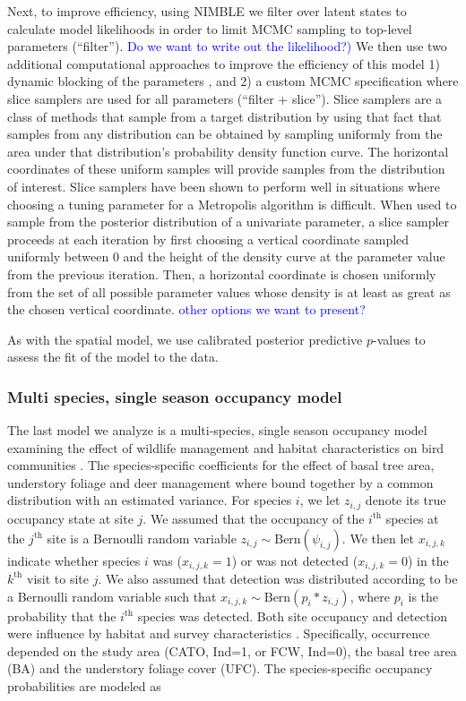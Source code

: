 \documentclass[12pt]{article}
\newcommand{\flagged}[1] {
  \textcolor{blue}{#1}
}
\begin{document}
Next, to improve efficiency, using NIMBLE we filter over latent states
to calculate model likelihoods in order to limit MCMC sampling to
top-level parameters (``filter''). \flagged{Do we want to write out
  the likelihood?)} We then use two additional computational
approaches to improve the efficiency of this model 1) dynamic blocking
of the parameters \citep[``filter + autoblocking'',
][]{turek2016efficient}, and 2) a custom MCMC specification where
slice samplers \citep{neal-03} are used for all parameters (``filter +
slice''). Slice samplers are a class of methods that sample from a
target distribution by using that fact that samples from any
distribution can be obtained by sampling uniformly from the area under
that distribution's probability density function curve.  The
horizontal coordinates of these uniform samples will provide samples
from the distribution of interest. Slice samplers have been shown to
perform well in situations where choosing a tuning parameter for a
Metropolis algorithm is difficult. When used to sample from the
posterior distribution of a univariate parameter, a slice sampler
proceeds at each iteration by first choosing a vertical coordinate
sampled uniformly between 0 and the height of the density curve at the
parameter value from the previous iteration.  Then, a horizontal
coordinate is chosen uniformly from the set of all possible parameter
values whose density is at least as great as the chosen vertical
coordinate.  \flagged{other options we want to present?}

As with the spatial model, we use calibrated posterior predictive
$p$-values \citep{hjort-etal-06} to assess the fit of the model to
the data.

\subsubsection*{Multi species, single season occupancy model}
\label{sec:msss}

The last model we analyze is a multi-species, single season occupancy
model examining the effect of wildlife management and habitat
characteristics on bird communities \citep{zipkin2010multi}. The
species-specific coefficients for the effect of basal tree area,
understory foliage and deer management where bound together by a
common distribution with an estimated variance.  For species $i$, we
let $z_{i,j}$ denote its true occupancy state at site $j$. We assumed
that the occupancy of the $i^{\mathrm{th}}$ species at the
$j^{\mathrm{th}}$ site is a Bernoulli random variable $z_{i,j} \sim
\mathrm{Bern}(\psi_{i,j})$.  We then let $x_{i,j,k}$ indicate whether
species $i$ was ($x_{i,j,k}=1$) or was not detected ($x_{i,j,k}=0$) in
the $k^{\mathrm{th}}$ visit to site $j$. We also assumed that
detection was distributed according to be a Bernoulli random variable
such that $x_{i,j,k} \sim \mathrm{Bern}(p_{i}*z_{i,j})$, where $p_{i}$
is the probability that the $i^{\mathrm{th}}$ species was
detected. Both site occupancy and detection were influence by habitat
and survey characteristics \citep{zipkin2010multi}. Specifically,
occurrence depended on the study area (CATO, Ind=1, or FCW, Ind=0), the
basal tree area (BA) and the understory foliage cover (UFC). The
species-specific occupancy probabilities are modeled as
\end{document}
